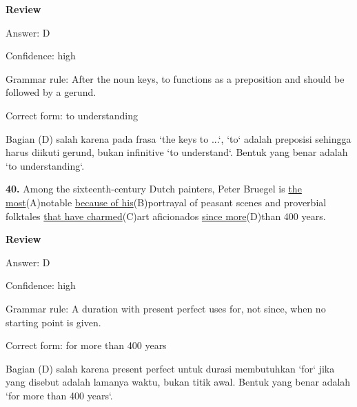 \documentclass[12pt]{article}
\begin{document}
\par
\begingroup
\setlength{\parskip}{0pt}
\setlength{\parindent}{0pt}
\textbf{Review}\par
Answer: D\par
Confidence: high\par
Grammar rule: After the noun keys, to functions as a preposition and should be followed by a gerund.\par
Correct form: to understanding\par
Bagian (D) salah karena pada frasa `the keys to ...`, `to` adalah preposisi sehingga harus diikuti gerund, bukan infinitive `to understand`. Bentuk yang benar adalah `to understanding`.\par
\endgroup
\par
\vspace{\questionblockgap}
\noindent\textbf{40.} Among the sixteenth-century Dutch painters, Peter Bruegel is \uline{the most}(A)notable \uline{because of his}(B)portrayal of peasant scenes and proverbial folktales \uline{that have charmed}(C)art aficionados \uline{since more}(D)than 400 years.
\par
\begingroup
\setlength{\parskip}{0pt}
\setlength{\parindent}{0pt}
\textbf{Review}\par
Answer: D\par
Confidence: high\par
Grammar rule: A duration with present perfect uses for, not since, when no starting point is given.\par
Correct form: for more than 400 years\par
Bagian (D) salah karena present perfect untuk durasi membutuhkan `for` jika yang disebut adalah lamanya waktu, bukan titik awal. Bentuk yang benar adalah `for more than 400 years`.\par
\endgroup
\par
\vspace{\questionblockgap}
\end{document}
